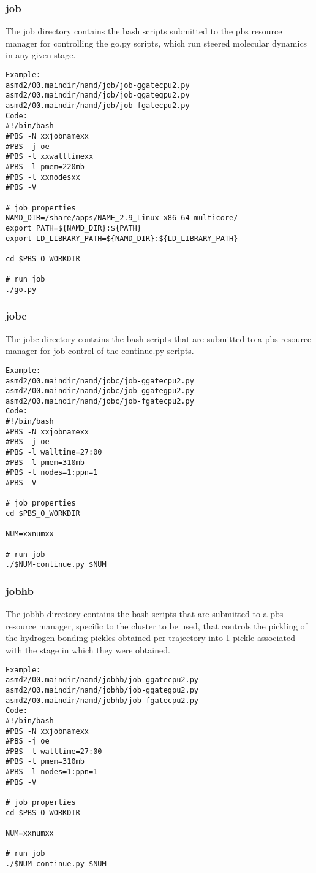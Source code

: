 \documentclass[11pt]{article}
\begin{document}
\subsubsection{job}
The job directory contains the bash scripts submitted to the pbs resource manager for controlling the go.py scripts, which run steered molecular dynamics in any given stage.
\begin{verbatim}
Example:
asmd2/00.maindir/namd/job/job-ggatecpu2.py
asmd2/00.maindir/namd/job/job-ggategpu2.py
asmd2/00.maindir/namd/job/job-fgatecpu2.py
Code:
#!/bin/bash
#PBS -N xxjobnamexx
#PBS -j oe
#PBS -l xxwalltimexx
#PBS -l pmem=220mb
#PBS -l xxnodesxx
#PBS -V

# job properties
NAMD_DIR=/share/apps/NAME_2.9_Linux-x86-64-multicore/
export PATH=${NAMD_DIR}:${PATH}
export LD_LIBRARY_PATH=${NAMD_DIR}:${LD_LIBRARY_PATH}

cd $PBS_O_WORKDIR

# run job
./go.py
\end{verbatim}

\subsubsection{jobc}
The jobc directory contains the bash scripts that are submitted to a pbs resource manager for job control of the continue.py scripts.
\begin{verbatim}
Example:
asmd2/00.maindir/namd/jobc/job-ggatecpu2.py
asmd2/00.maindir/namd/jobc/job-ggategpu2.py
asmd2/00.maindir/namd/jobc/job-fgatecpu2.py
Code:
#!/bin/bash
#PBS -N xxjobnamexx
#PBS -j oe
#PBS -l walltime=27:00
#PBS -l pmem=310mb
#PBS -l nodes=1:ppn=1
#PBS -V

# job properties
cd $PBS_O_WORKDIR

NUM=xxnumxx

# run job
./$NUM-continue.py $NUM
\end{verbatim}

\subsubsection{jobhb}
The jobhb directory contains the bash scripts that are submitted to a pbs resource manager, specific to the cluster to be used, that controls the pickling of the hydrogen bonding pickles obtained per trajectory into 1 pickle associated with the stage in which they were obtained.
\begin{verbatim}
Example:
asmd2/00.maindir/namd/jobhb/job-ggatecpu2.py
asmd2/00.maindir/namd/jobhb/job-ggategpu2.py
asmd2/00.maindir/namd/jobhb/job-fgatecpu2.py
Code:
#!/bin/bash
#PBS -N xxjobnamexx
#PBS -j oe
#PBS -l walltime=27:00
#PBS -l pmem=310mb
#PBS -l nodes=1:ppn=1
#PBS -V

# job properties
cd $PBS_O_WORKDIR

NUM=xxnumxx

# run job
./$NUM-continue.py $NUM
\end{verbatim}
\end{document}
